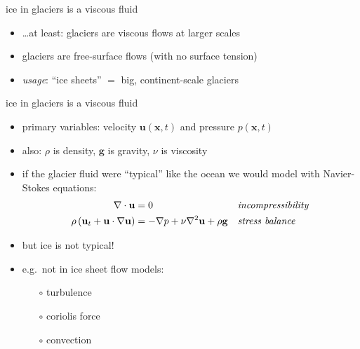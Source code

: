 \documentclass[hide notes,intlimits]{beamer}
\newcommand{\bx}{\mathbf{x}}
\begin{document}
\begin{frame}{ice in glaciers is a viscous fluid}
\bigskip\bigskip
\begin{itemize}
\item \dots at least: glaciers are viscous flows at larger scales
\item glaciers are free-surface flows (with no surface tension)
\item \emph{usage}: ``ice sheets'' $=$ big, continent-scale glaciers
\end{itemize}
\end{frame}


\begin{frame}{ice in glaciers is a viscous fluid}

\begin{itemize}
\item primary variables: velocity $\mathbf{u}(\bx,t)$ and pressure $p(\bx,t)$
\item also: $\rho$ is density, $\mathbf{g}$ is gravity, $\nu$ is viscosity
\item if the glacier fluid were ``typical'' like the ocean we would model with Navier-Stokes equations:
\begin{align*}
\nabla \cdot \mathbf{u} &= 0 &&\text{\emph{incompressibility}} \\
\rho \left(\mathbf{u}_t + \mathbf{u}\cdot\nabla \mathbf{u}\right) &= -\nabla p + \nu \nabla^2 \mathbf{u} + \rho \mathbf{g} &&\text{\emph{stress balance}}
\end{align*}
\item but ice is not typical!
\item e.g.~not in ice sheet flow models:
  \begin{itemize}
  \item[$\circ$] turbulence
  \item[$\circ$] coriolis force
  \item[$\circ$] convection
  \end{itemize}
\end{itemize}
\end{frame}
\end{document}
